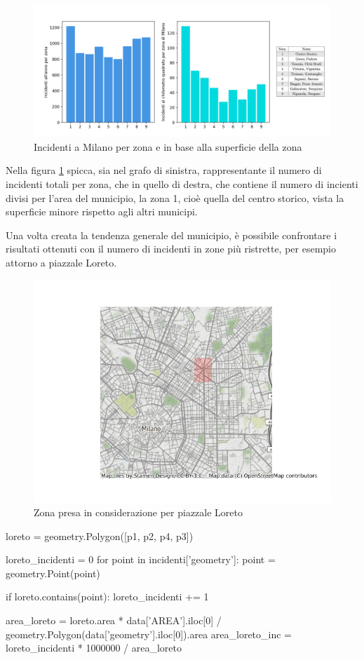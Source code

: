 \documentclass[a4paper,12pt]{report}
\begin{document}
\begin{figure}
    \includegraphics[width=\linewidth]{../src/municipi_milano/incidenti_superf.png}
    \caption{Incidenti a Milano per zona e in base alla superficie della zona}
    \label{fig:incidenti-chilometro}
\end{figure}

Nella figura \ref{fig:incidenti-chilometro} spicca, sia nel grafo di sinistra, rappresentante 
il numero di incidenti totali per zona, che in 
quello di destra, che contiene il numero di incienti divisi per l'area del municipio, 
la zona 1, cioè quella del centro storico, vista la superficie minore 
rispetto agli altri municipi.

Una volta creata la tendenza generale del municipio, è possibile confrontare i risultati 
ottenuti con il numero di incidenti in zone più ristrette, per esempio attorno a piazzale Loreto.

\begin{figure}
    \hfill\includegraphics[width=0.7\linewidth]{../src/municipi_milano/zona_loreto.png}\hspace*{\fill}
    \caption{Zona presa in considerazione per piazzale Loreto}
    \label{fig:zona-loreto}
\end{figure}

\begin{code}
loreto = geometry.Polygon([p1, p2, p4, p3])

loreto_incidenti = 0
for point in incidenti['geometry']: 
    point = geometry.Point(point)

    if loreto.contains(point): 
        loreto_incidenti += 1

area_loreto = loreto.area * data['AREA'].iloc[0] / geometry.Polygon(data['geometry'].iloc[0]).area
area_loreto_inc = loreto_incidenti * 1000000 / area_loreto
\end{code}
\end{document}
